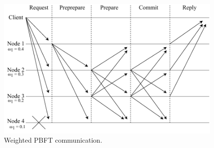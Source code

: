 \begin{figure}[h]
	\centering
	\includegraphics[width=0.8\linewidth]{obrazky-figures/WeightedPBFT.pdf}
	\caption{Weighted PBFT communication.}
	\label{WeightedPBFTcommunication}
\end{figure}

